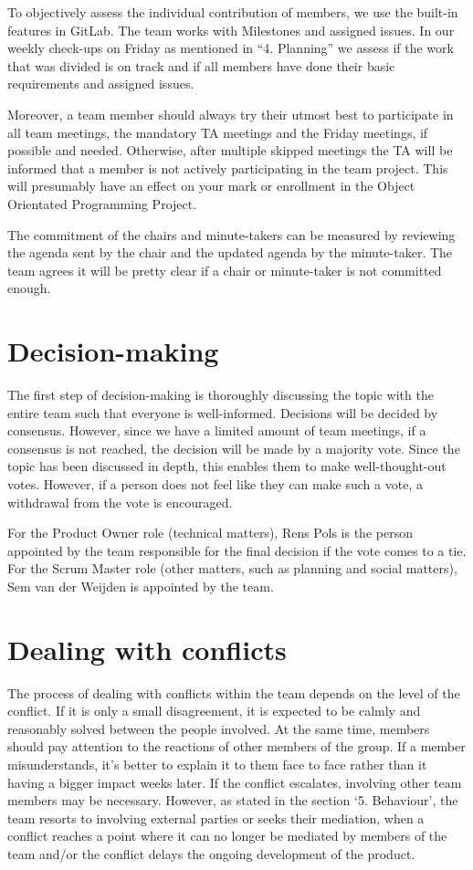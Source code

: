 \documentclass[sigconf,nonacm]{acmart}
\begin{document}
To objectively assess the individual contribution of members, we use the built-in features in GitLab. The team works with Milestones and assigned issues. In our weekly check-ups on Friday as mentioned in “4. Planning” we assess if the work that was divided is on track and if all members have done their basic requirements and assigned issues.

Moreover, a team member should always try their utmost best to participate in all team meetings, the mandatory TA meetings and the Friday meetings, if possible and needed. Otherwise, after multiple skipped meetings the TA will be informed that a member is not actively participating in the team project. This will presumably have an effect on your mark or enrollment in the Object Orientated Programming Project.

The commitment of the chairs and minute-takers can be measured by reviewing the agenda sent by the chair and the updated agenda by the minute-taker. The team agrees it will be pretty clear if a chair or minute-taker is not committed enough. 


\section{Decision-making}
The first step of decision-making is thoroughly discussing the topic with the entire team such that everyone is well-informed. Decisions will be decided by consensus. However, since we have a limited amount of team meetings, if a consensus is not reached, the decision will be made by a majority vote. Since the topic has been discussed in depth, this enables them to make well-thought-out votes. However, if a person does not feel like they can make such a vote, a withdrawal from the vote is encouraged.

For the Product Owner role (technical matters), Rens Pols is the person appointed by the team responsible for the final decision if the vote comes to a tie.
For the Scrum Master role (other matters, such as planning and social matters), Sem van der Weijden is appointed by the team.


\section{Dealing with conflicts}
The process of dealing with conflicts within the team depends on the level of the conflict. If it is only a small disagreement, it is expected to be calmly and reasonably solved between the people involved. At the same time, members should pay attention to the reactions of other members of the group. If a member misunderstands, it's better to explain it to them face to face rather than it having a bigger impact weeks later. If the conflict escalates, involving other team members may be necessary. However, as stated in the section ‘5. Behaviour’, the team resorts to involving external parties or seeks their mediation, when a conflict reaches a point where it can no longer be mediated by members of the team and/or the conflict delays the ongoing development of the product.
\end{document}
